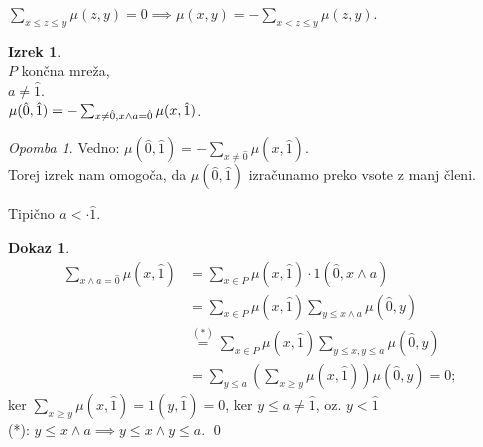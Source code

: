 \documentclass[a4paper, 12pt]{book}
\theoremstyle{definition}
\newtheorem{theorem}[counter]{Izrek}
\newtheorem{pro}[counter]{Dokaz}
\theoremstyle{remark}
\newtheorem*{rem}{Opomba}
\begin{document}
$\sum_{x \leq z \leq y} \mu(z, y) = 0 \implies \mu(x, y) = - \sum_{x < z \leq y} \mu(z, y)$.
\begin{theorem} \text{} \\
  $P$ končna mreža, \\
  $a \neq \hat{1}$. \\
  $\mu(\hat{0}, \hat{1}) = - \sum_{x \neq \hat{0}, \\x \land a = \hat{0}} \mu(x, \hat{1})$.
\end{theorem}
\begin{rem}
  Vedno: $\mu(\hat{0}, \hat{1}) = - \sum_{x \neq \hat{0}} \mu(x, \hat{1})$. \\
  Torej izrek nam omogoča, da $\mu(\hat{0}, \hat{1})$ izračunamo preko vsote z manj členi.
\end{rem}
Tipično $a <\cdot \hat{1}$.
\begin{pro}
  \begin{align*}
    \sum_{x \land a = \hat{0}} \mu(x, \hat{1}) &= \sum_{x \in P} \mu(x, \hat{1}) \cdot 1(\hat{0}, x \land a) \\
    &= \sum_{x \in P} \mu(x, \hat{1}) \sum_{y \leq x \land a} \mu(\hat{0}, y) \\
    &\stackrel{(*)}{=} \sum_{x \in P} \mu(x, \hat{1})
      \sum_{y \leq x, y \leq a} \mu(\hat{0}, y) \\
    &= \sum_{y \leq a} \left(\sum_{x \geq y} \mu(x, \hat{1})\right) \mu(\hat{0}, y) = 0;
  \end{align*}
  ker $\sum_{x \geq y} \mu(x, \hat{1}) = 1(y, \hat{1}) = 0$, ker $y \leq a \neq \hat{1}$, oz. $y < \hat{1}$\\
  (*): $y \leq x \land a \implies y \leq x \land y \leq a$.
  \qed
\end{pro}
\end{document}
